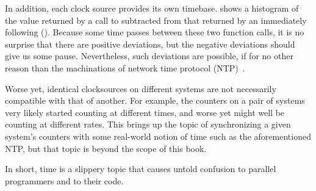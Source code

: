 In addition, each clock source provides its own timebase.
shows a histogram of the value returned by a call to
 subtracted from that returned by an
immediately following 
().
Because some time passes between these two function calls, it is no
surprise that there are positive deviations, but the negative deviations
should give us some pause.
Nevertheless, such deviations are possible, if for no other reason than
the machinations of network time protocol
(NTP)~\cite{FredericWeisbecker2022nohzfullTSC}.

Worse yet, identical clocksources on different systems
are not necessarily compatible with that of another.
For example, the  counters on a pair of systems very likely
started counting at different times, and worse yet might well be counting
at different rates.
This brings up the topic of synchronizing a given system's counters
with some real-world notion of time such as the aforementioned NTP,
but that topic is beyond the scope of this book.

In short, time is a slippery topic that causes untold confusion to
parallel programmers and to their code.
